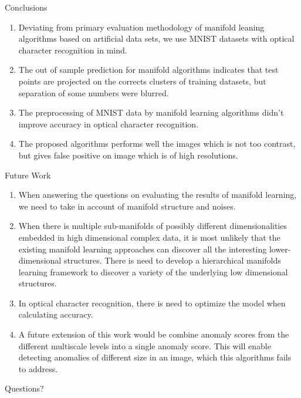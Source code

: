 \documentclass{beamer}
\theoremstyle{plain}
\theoremstyle{definition}
\theoremstyle{plain}
\theoremstyle{plain}
\begin{document}
\begin{frame}{Conclusions}

\begin{enumerate}
\item Deviating from primary evaluation methodology of manifold leaning algorithms based on artificial data sets, we use MNIST datasets with optical character recognition in mind.
\item The out of sample prediction for manifold algorithms indicates that test points are projected on the corrects clusters of training datasets, but separation of some numbers were blurred.
\item The preprocessing of MNIST data by manifold learning algorithms didn't improve accuracy in optical character recognition. 
\item The proposed algorithms performs well the images which is not too contrast, but gives false positive on image which is of high resolutions.
\end{enumerate}

\end{frame}
\begin{frame}{Future Work}
\begin{enumerate}
\item When answering the questions on evaluating the results of manifold learning, we need to take in account of manifold structure and noises.
\item When there is multiple sub-manifolds of possibly different dimensionalities embedded in high dimensional complex data, it is most unlikely that the existing manifold learning approaches can discover all the interesting lower-dimensional structures. There is need to develop a hierarchical manifolds learning framework to discover a variety of the underlying low dimensional structures.
\item In optical character recognition, there is need to optimize the model when calculating accuracy. 
\item A future extension of this work would be combine  anomaly scores from the different multiscale levels into a single anomaly score. This will enable detecting anomalies of different size in an image, which this algorithms fails to address.
\end{enumerate}

\end{frame}
\begin{frame}
\Huge{\centerline{Questions?}}
\end{frame}

\end{document}
